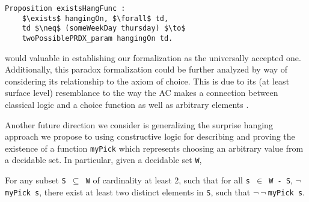 \documentclass[journal]{journal}
\newenvironment{myindent}{\begin{adjustwidth}{1cm}{}}{\end{adjustwidth}}
\begin{document}
\begin{lstlisting}[mathescape=true]
  Proposition existsHangFunc :
    $\exists$ hangingOn, $\forall$ td,
    td $\neq$ (someWeekDay thursday) $\to$
    twoPossiblePRDX_param hangingOn td.
\end{lstlisting}

would valuable in
establishing our formalization as the universally accepted one. Additionally,
this paradox formalization could be further analyzed by way of considering its
relationship to the axiom of choice. This is due to its (at least surface level)
resemblance to the way the AC makes a connection between classical logic
and a choice function \cite{accomp} as well as arbitrary elements \cite{randomness}.

Another future direction we consider is generalizing the surprise hanging
approach we propose to using constructive logic for describing and proving
the existence of a function {\tt myPick}
which represents choosing an arbitrary value from a decidable set. In particular,
given a decidable set {\tt W}, \newline

\begin{myindent}
For any subset {\tt S $\subseteq$ W} of cardinality at least 2, such that for all
{\tt s $\in$ W - S}, $\neg ${\tt myPick s}, there exist at least two distinct
elements in {\tt S}, such that $\neg~\neg~${\tt myPick s}.
\end{myindent}


%
%
\end{document}
